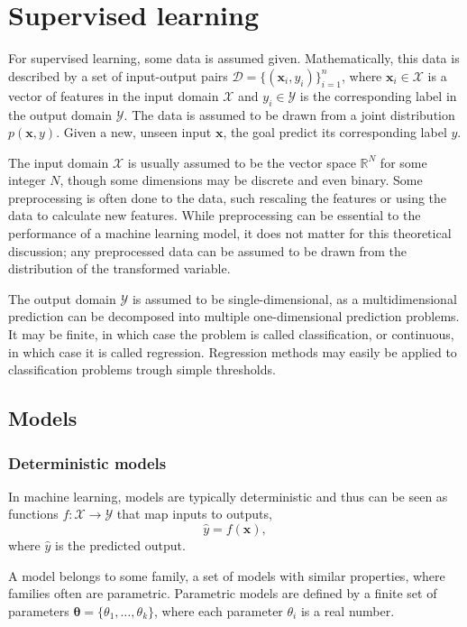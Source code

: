 \section{Supervised learning}
For supervised learning, some data is assumed given.
Mathematically, this data is described by a set of input-output pairs $\mathcal{D} = \{(\bm{x}_i, y_i)\}_{i=1}^n$, where $\bm{x}_i\in\mathcal{X}$ is a vector of features in the input domain $\mathcal{X}$ and $y_i\in\mathcal{Y}$ is the corresponding label in the output domain $\mathcal{Y}$.
The data is assumed to be drawn from a joint distribution $p(\bm{x}, y)$.
Given a new, unseen input $\bm{x}$, the goal predict its corresponding label $y$.

The input domain $\mathcal{X}$ is usually assumed to be the vector space $\mathbb{R}^N$ for some integer $N$, though some dimensions may be discrete and even binary.
Some preprocessing is often done to the data, such rescaling the features or using the data to calculate new features.
While preprocessing can be essential to the performance of a machine learning model, it does not matter for this theoretical discussion; any preprocessed data can be assumed to be drawn from the distribution of the transformed variable.

The output domain $\mathcal{Y}$ is assumed to be single-dimensional, as a multidimensional prediction can be decomposed into multiple one-dimensional prediction problems.
It may be finite, in which case the problem is called classification, or continuous, in which case it is called regression.
Regression methods may easily be applied to classification problems trough simple thresholds.

\subsection{Models}
\subsubsection{Deterministic models}
In machine learning, models are typically deterministic and thus can be seen as functions $f:\mathcal{X}\to\mathcal{Y}$ that map inputs to outputs,
\begin{equation}
    \hat{y} = f(\bm{x}),
\end{equation}
where $\hat{y}$ is the predicted output.

A model belongs to some family, a set of models with similar properties, where families often are parametric.
Parametric models are defined by a finite set of parameters $\bm{\theta}= \{\theta_1, \ldots, \theta_k\}$, where each parameter $\theta_i$ is a real number.

